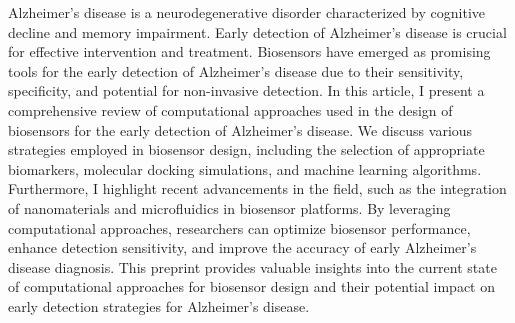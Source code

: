 Alzheimer's disease is a neurodegenerative disorder characterized by cognitive decline and memory impairment. 
Early detection of Alzheimer's disease is crucial for effective intervention and treatment. 
Biosensors have emerged as promising tools for the early detection of Alzheimer's disease due to their sensitivity, 
specificity, 
and potential for non-invasive detection. 
In this article, 
I present a comprehensive review of computational approaches used in the design of biosensors for the early detection of Alzheimer's disease. 
We discuss various strategies employed in biosensor design, 
including the selection of appropriate biomarkers, 
molecular docking simulations, 
and machine learning algorithms. 
Furthermore, 
I highlight recent advancements in the field, 
such as the integration of nanomaterials and microfluidics in biosensor platforms. 
By leveraging computational approaches, 
researchers can optimize biosensor performance, 
enhance detection sensitivity, 
and improve the accuracy of early Alzheimer's disease diagnosis. 
This preprint provides valuable insights into the current state of computational approaches for biosensor design and their potential impact on early detection strategies for Alzheimer's disease.